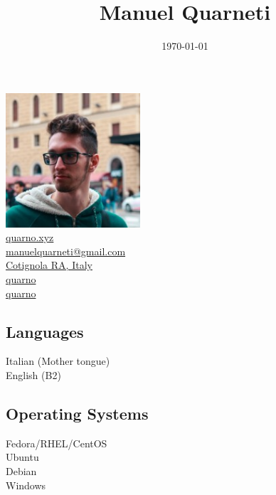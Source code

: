 \documentclass{article}
\title{\HUGE Manuel Quarneti \\[-20pt]}
\author{}
\date{\today}
\begin{document}
\setmainfont{Noto Sans}

\setlength{\columnsep}{2.2em}
\setlength{\columnseprule}{4pt}
\begin{paracol}{2}

\begin{center}
    \includegraphics[height=5cm]{me} \\[20pt]

    \href{https://quarno.xyz/}{ quarno.xyz} \\[8pt]
    \href{mailto:manuelquarneti@gmail.com}{ manuelquarneti@gmail.com} \\[8pt]
    \href{https://www.openstreetmap.org/relation/43112}{ Cotignola RA, Italy} \\[8pt]
    \href{https://github.com/quarno}{ quarno} \\[8pt]
    \href{https://www.linkedin.com/in/quarno}{ quarno}

    \vfill

    \subsection*{\center Languages}
     Italian (Mother tongue) \\[4pt]
     English (B2)

    \subsection*{\center Operating Systems}
     Fedora/RHEL/CentOS \\[4pt]
     Ubuntu \\[4pt]
     Debian \\[4pt]
     Windows


\end{center}
\end{paracol}
\end{document}
